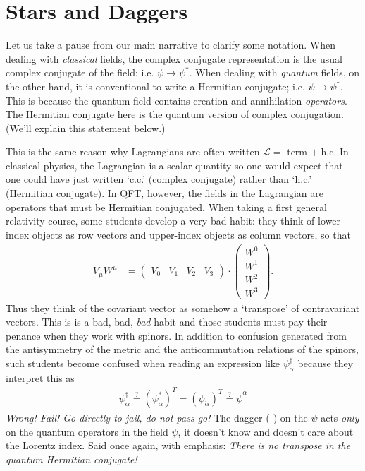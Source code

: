 \section{Stars and Daggers}\label{sec:SUSYalg:starsanddaggers}


Let us take a pause from our main narrative to clarify some notation. When dealing with \textit{classical} fields, the complex conjugate representation is the usual complex conjugate of the field; i.e. $\psi \rightarrow \psi^*$. When dealing with \textit{quantum} fields, on the other hand, it is conventional to write a Hermitian conjugate; i.e. $\psi \rightarrow \psi^\dag$. This is because the quantum field contains creation and annihilation \textit{operators}. The Hermitian conjugate here is the quantum version of complex conjugation. (We'll explain this statement below.)

This is the same reason why Lagrangians are often written $\mathcal L =$ term $+\; \text{h.c.}$ 
%
In classical physics, the Lagrangian is a scalar quantity so one would expect that one could have just written `c.c.' (complex conjugate) rather than `h.c.' (Hermitian conjugate). In QFT, however, the fields in the Lagrangian are operators that must be Hermitian conjugated.
 When taking a first general relativity course, some students develop a very bad habit: they think of lower-index objects as row vectors and upper-index objects as column vectors, so that
\begin{align}
    V_\mu W^\mu &= \begin{pmatrix}
        V_0 & V_1 & V_2 & V_3
    \end{pmatrix}\cdot
    \begin{pmatrix}
        W^0 \\ W^1 \\ W^2 \\ W^3
    \end{pmatrix}.
\end{align}
Thus they think of the covariant vector as somehow a `transpose' of contravariant vectors. This is is a bad, bad, \textit{bad} habit and those students must pay their penance when they work with spinors. In addition to confusion generated from the antisymmetry of the metric and the anticommutation relations of the spinors, such students become confused when reading an expression like $\psi_\alpha^\dag$ because they interpret this as 
\begin{align}
    \psi_\alpha^\dag \stackrel{?}{=} (\psi_\alpha^*)^T = (\overline\psi_{\dot\alpha})^T \stackrel{?}{=} \overline\psi^{\dot\alpha}
\end{align}
\textit{Wrong! Fail! Go directly to jail, do not pass go!}
The dagger ($^\dag$) on the $\psi$ acts \textit{only} on the quantum operators in the field $\psi$, it doesn't know and doesn't care about the Lorentz index. Said once again, with emphasis: \textit{There is no transpose in the quantum Hermitian conjugate!}

